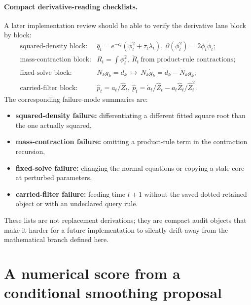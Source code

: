 \paragraph{Compact derivative-reading checklists.}
A later implementation review should be able to verify the derivative lane block
by block:
\begin{equation}
\begin{array}{ll}
\text{squared-density block:} & \overline q_t=e^{-c_t}(\phi_t^2+\tau_t\lambda_t),\ \partial(\phi_t^2)=2\phi_t\dot\phi_t;\\[1mm]
\text{mass-contraction block:} & R_t=\int \phi_t^2,\ \dot R_t\ \text{from product-rule contractions};\\[1mm]
\text{fixed-solve block:} & N_kg_k=d_k\ \mapsto\ N_k\dot g_k=\dot d_k-\dot N_kg_k;\\[1mm]
\text{carried-filter block:} & \widehat p_t=a_t/\widehat Z_t,\ \dot{\widehat p}_t=\dot a_t/\widehat Z_t-a_t\dot{\widehat Z}_t/\widehat Z_t^2.
\end{array}
  \label{eq:bf-hd-ttkr-derivative-checklists}
\end{equation}
The corresponding failure-mode summaries are:
\begin{itemize}[leftmargin=0.28in]
  \item \textbf{squared-density failure:} differentiating a different fitted
  square root than the one actually squared,
  \item \textbf{mass-contraction failure:} omitting a product-rule term in the
  contraction recursion,
  \item \textbf{fixed-solve failure:} changing the normal equations or copying a
  stale core at perturbed parameters,
  \item \textbf{carried-filter failure:} feeding time \(t+1\) without the saved
  dotted retained object or with an undeclared query rule.
\end{itemize}
These lists are not replacement derivations; they are compact audit objects that
make it harder for a future implementation to silently drift away from the
mathematical branch defined here.

\section{A numerical score from a conditional smoothing proposal}
\label{sec:bf-hd-quadratic-reference}

